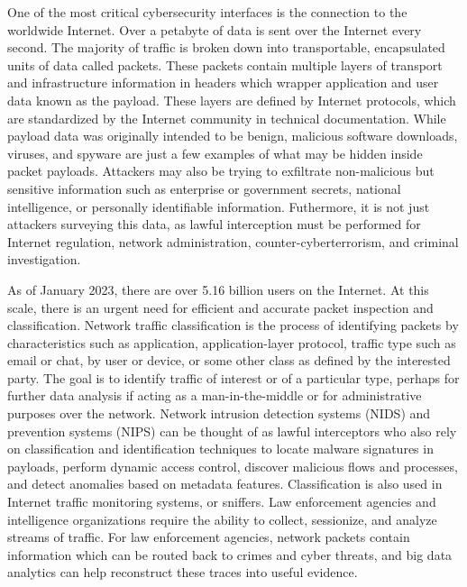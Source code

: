 One of the most critical cybersecurity interfaces is the connection to the worldwide Internet. Over a petabyte of data is sent over the Internet every second. The majority of traffic is broken down into transportable, encapsulated units of data called packets. These packets contain multiple layers of transport and infrastructure information in headers which wrapper application and user data known as the payload. These layers are defined by Internet protocols, which are standardized by the Internet community in technical documentation. While payload data was originally intended to be benign, malicious software downloads, viruses, and spyware are just a few examples of what may be hidden inside packet payloads. Attackers may also be trying to exfiltrate non-malicious but sensitive information such as enterprise or government secrets, national intelligence, or personally identifiable information. Futhermore, it is not just attackers surveying this data, as lawful interception must be performed for Internet regulation, network administration, counter-cyberterrorism, and criminal investigation.

As of January 2023, there are over 5.16 billion users on the Internet. At this scale, there is an urgent need for efficient and accurate packet inspection and classification. Network traffic classification is the process of identifying packets by characteristics such as application, application-layer protocol, traffic type such as email or chat, by user or device, or some other class as defined by the interested party. The goal is to identify traffic of interest or of a particular type, perhaps  for further data analysis if acting as a man-in-the-middle or for administrative purposes over the network. Network intrusion detection systems (NIDS) and prevention systems (NIPS) can be thought of as lawful interceptors who also rely on classification and identification techniques to locate malware signatures in payloads, perform dynamic access control, discover malicious flows and processes, and detect anomalies based on metadata features. Classification is also used in Internet traffic monitoring systems, or sniffers. Law enforcement agencies and intelligence organizations require the ability to collect, sessionize, and analyze streams of traffic. For law enforcement agencies, network packets contain information which can be routed back to crimes and cyber threats, and big data analytics can help reconstruct these traces into useful evidence.

